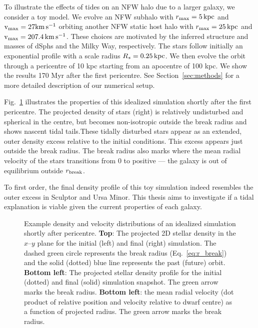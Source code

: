 To illustrate the effects of tides on an NFW halo due to a larger
galaxy, we consider a toy model. We evolve an NFW subhalo with
\(r_{\rm max}=5\,{\rm kpc}\) and \({\rm v}_{\rm max} = 27{\rm km\,s^{-1}}\) orbiting another NFW static
host halo with \(r_{\rm max}=25\,{\rm kpc}\) and \({\rm v}_{\rm max} = 207.4\,{\rm km\,s^{-1}}\). These
choices are motivated by the inferred structure and masses of dSphs and
the Milky Way, respectively. The stars follow initially an exponential
profile with a scale radius \(R_s=0.25\,{\rm kpc}\). We then evolve the orbit
through a pericentre of 10 kpc starting from an apocentre of 100 kpc. We
show the results 170 Myr after the first pericentre. See
Section~\ref{sec:methods} for a more detailed description of our
numerical setup.

Fig.~\ref{fig:idealized_break_radius} illustrates the properties of this
idealized simulation shortly after the first pericentre. The projected
density of stars (right) is relatively undisturbed and spherical in the
centre, but becomes non-isotropic outside the break radius and shows
nascent tidal tails.These tidally disturbed stars appear as an extended,
outer density excess relative to the initial conditions. This excess
appears just outside the break radius. The break radius also marks where
the mean radial velocity of the stars transitions from 0 to positive ---
the galaxy is out of equilibrium outside \(r_{\rm break}\).

To first order, the final density profile of this toy simulation indeed
resembles the outer excess in Sculptor and Ursa Minor. This thesis aims
to investigate if a tidal explanation is viable given the current
properties of each galaxy.

\begin{figure}
\centering
{}
\caption[Example tidal simulation]{Example density and velocity
distributions of an idealized simulation shortly after pericentre.
\textbf{Top}: The projected 2D stellar density in the \(x\)--\(y\) plane
for the initial (left) and final (right) simulation. The dashed green
circle represents the break radius (Eq.~\ref{eq:r_break}) and the solid
(dotted) blue line represents the past (future) orbit. \textbf{Bottom
left}: The projected stellar density profile for the initial (dotted)
and final (solid) simulation snapshot. The green arrow marks the break
radius. \textbf{Bottom left}: the mean radial velocity (dot product of
relative position and velocity relative to dwarf centre) as a function
of projected radius. The green arrow marks the break
radius.}\label{fig:idealized_break_radius}
\end{figure}

